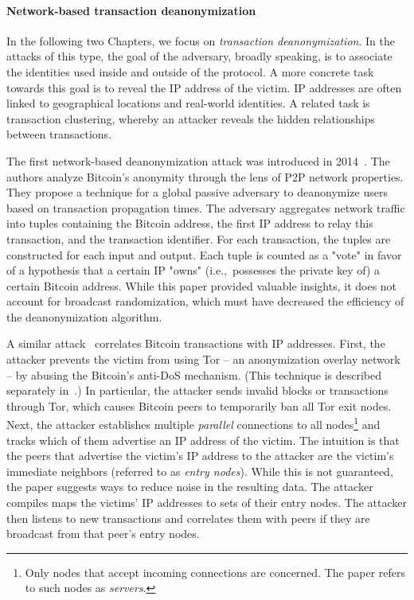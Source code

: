 \paragraph{Network-based transaction deanonymization}

In the following two Chapters, we focus on \textit{transaction deanonymization}.
In the attacks of this type, the goal of the adversary, broadly speaking, is to associate the identities used inside and outside of the protocol.
A more concrete task towards this goal is to reveal the IP address of the victim.
IP addresses are often linked to geographical locations and real-world identities.
A related task is transaction clustering, whereby an attacker reveals the hidden relationships between transactions.

The first network-based deanonymization attack was introduced in 2014~\cite{Koshy2014}.
The authors analyze Bitcoin's anonymity through the lens of P2P network properties.
They propose a technique for a global passive adversary to deanonymize users based on transaction propagation times.
The adversary aggregates network traffic into tuples containing the Bitcoin address, the first IP address to relay this transaction, and the transaction identifier.
For each transaction, the tuples are constructed for each input and output.
Each tuple is counted as a "vote" in favor of a hypothesis that a certain IP "owns" (i.e.,~possesses the private key of) a certain Bitcoin address.
While this paper provided valuable insights, it does not account for broadcast randomization, which must have decreased the efficiency of the deanonymization algorithm.

A similar attack~\cite{Biryukov2014} correlates Bitcoin transactions with IP addresses.
First, the attacker  prevents the victim from using Tor -- an anonymization overlay network -- by abusing the Bitcoin's anti-DoS mechanism.
(This technique is described separately in~\cite{Biryukov2015}.)
In particular, the attacker sends invalid blocks or transactions through Tor, which causes Bitcoin peers to temporarily ban all Tor exit nodes.
Next, the attacker establishes multiple \textit{parallel} connections to all nodes\footnote{Only nodes that accept incoming connections are concerned. The paper refers to such nodes as \textit{servers}.} and tracks which of them advertise an IP address of the victim.
The intuition is that the peers that advertise the victim's IP address to the attacker are the victim's immediate neighbors (referred to as \textit{entry nodes}).
While this is not guaranteed, the paper suggests ways to reduce noise in the resulting data.
The attacker compiles maps the victims' IP addresses to sets of their entry nodes.
The attacker then listens to new transactions and correlates them with peers if they are broadcast from that peer's entry nodes.


